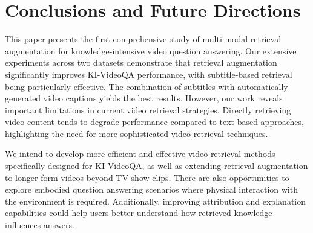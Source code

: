 \section{Conclusions and Future Directions}


This paper presents the first comprehensive study of multi-modal retrieval augmentation for knowledge-intensive video question answering. Our extensive experiments across two datasets demonstrate that retrieval augmentation significantly improves KI-VideoQA performance, with subtitle-based retrieval being particularly effective. The combination of subtitles with automatically generated video captions yields the best results. However, our work reveals important limitations in current video retrieval strategies. Directly retrieving video content tends to degrade performance compared to text-based approaches, highlighting the need for more sophisticated video retrieval techniques.

We intend to develop more efficient and effective video retrieval methods specifically designed for KI-VideoQA, as well as extending retrieval augmentation to longer-form videos beyond TV show clips. There are also opportunities to explore embodied question answering scenarios where physical interaction with the environment is required. Additionally, improving attribution and explanation capabilities could help users better understand how retrieved knowledge influences answers.